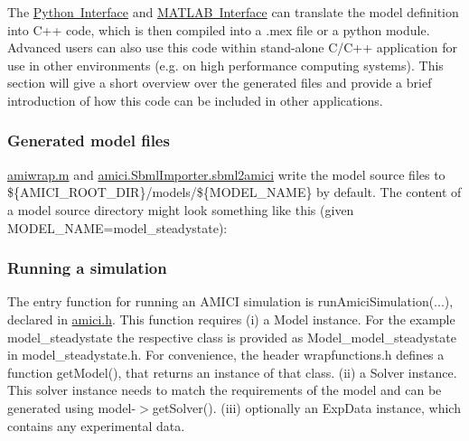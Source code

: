 The \mbox{\hyperlink{python_interface}{Python Interface}} and \mbox{\hyperlink{matlab_interface}{M\+A\+T\+L\+AB Interface}} can translate the model definition into C++ code, which is then compiled into a .mex file or a python module. Advanced users can also use this code within stand-\/alone C/\+C++ application for use in other environments (e.\+g. on high performance computing systems). This section will give a short overview over the generated files and provide a brief introduction of how this code can be included in other applications.

\subsubsection*{Generated model files}

{\ttfamily \mbox{\hyperlink{amiwrap_8m}{amiwrap.\+m}}} and {\ttfamily \mbox{\hyperlink{classamici_1_1sbml__import_1_1_sbml_importer_ab02f5c6e1bc803fe8223280ebb555a82}{amici.\+Sbml\+Importer.\+sbml2amici}}} write the model source files to \$\{A\+M\+I\+C\+I\+\_\+\+R\+O\+O\+T\+\_\+\+D\+IR\}/models/\$\{M\+O\+D\+E\+L\+\_\+\+N\+A\+ME\} by default. The content of a model source directory might look something like this (given {\ttfamily M\+O\+D\+E\+L\+\_\+\+N\+A\+ME=model\+\_\+steadystate})\+:


\begin{DoxyCode}{0}
\end{DoxyCode}


\subsubsection*{Running a simulation}

The entry function for running an A\+M\+I\+CI simulation is {\ttfamily run\+Amici\+Simulation(...)}, declared in \mbox{\hyperlink{amici_8h_source}{amici.\+h}}. This function requires (i) a {\ttfamily Model} instance. For the example {\ttfamily model\+\_\+steadystate} the respective class is provided as {\ttfamily Model\+\_\+model\+\_\+steadystate} in {\ttfamily model\+\_\+steadystate.\+h}. For convenience, the header {\ttfamily wrapfunctions.\+h} defines a function {\ttfamily get\+Model()}, that returns an instance of that class. (ii) a {\ttfamily Solver} instance. This solver instance needs to match the requirements of the model and can be generated using {\ttfamily model-\/$>$get\+Solver()}. (iii) optionally an {\ttfamily Exp\+Data} instance, which contains any experimental data.

